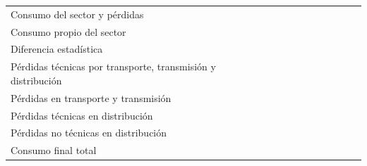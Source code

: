 \documentclass{sener2025}
\begin{document}
\begin{tabladoradoLargo}
\begin{xltabular}{\textwidth}{QZZZZZZZZZZZZZ}
    Consumo del sector y pérdidas &  &  &  &  &  &  &  &  &  &  &  &  &  \\
    \hspace{1.35em} Consumo propio del sector &  &  &  &  &  &  &  &  &  &  &  &  &  \\
    \hspace{1.35em} Diferencia estadística &  &  &  &  &  &  &  &  &  &  &  &  &  \\
    \hspace{1.35em} Pérdidas técnicas por transporte, transmisión y distribución &  &  &  &  &  &  &  &  &  &  &  &  &  \\
    \hspace{2.7em} Pérdidas en transporte y transmisión &  &  &  &  &  &  &  &  &  &  &  &  &  \\
    \hspace{2.7em} Pérdidas técnicas en distribución &  &  &  &  &  &  &  &  &  &  &  &  &  \\
    \hspace{2.7em} Pérdidas no técnicas  en distribución &  &  &  &  &  &  &  &  &  &  &  &  &  \\
    Consumo final total &  &  &  &  &  &  &  &  &  &  &  &  &  \\

\end{xltabular}
\end{tabladoradoLargo}
\end{document}

